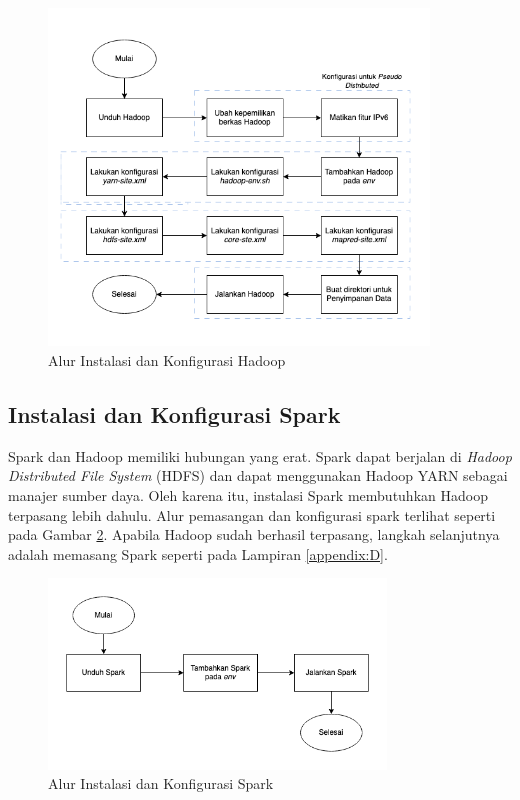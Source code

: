 \begin{figure}[h!]
    \centering
    \includegraphics[width=0.9\textwidth]{figures/ch03/hadoop-flow.png}
    \caption{Alur Instalasi dan Konfigurasi Hadoop}
    \label{fig:hadoop-flow}
\end{figure}

\subsection{Instalasi dan Konfigurasi Spark}
Spark dan Hadoop memiliki hubungan yang erat. Spark dapat berjalan di \textit{Hadoop Distributed File System} (HDFS) dan dapat menggunakan Hadoop YARN sebagai manajer sumber daya. Oleh karena itu, instalasi Spark membutuhkan Hadoop terpasang lebih dahulu. Alur pemasangan dan konfigurasi spark terlihat seperti pada Gambar \ref{fig:spark-flow}. Apabila Hadoop sudah berhasil terpasang, langkah selanjutnya adalah memasang Spark seperti pada Lampiran \ref{appendix:D}.

\begin{figure}[h]
    \centering
    \includegraphics[width=0.8\textwidth]{figures/ch03/spark-flow.png}
    \caption{Alur Instalasi dan Konfigurasi Spark}
    \label{fig:spark-flow}
\end{figure}

